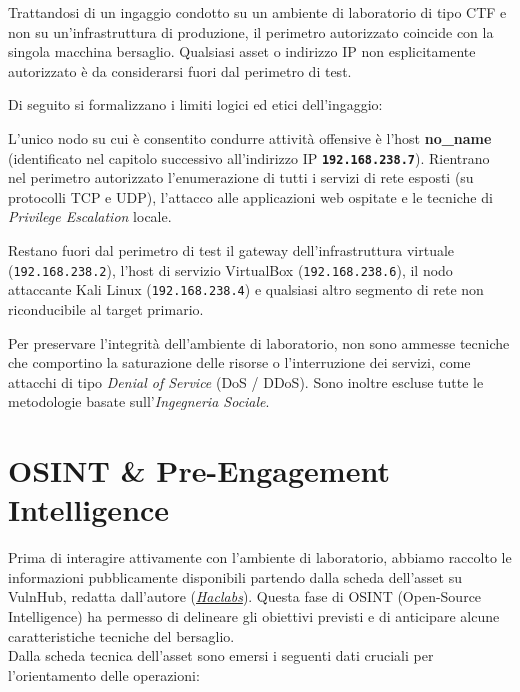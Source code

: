 \documentclass[11pt]{report}
\begin{document}
	Trattandosi di un ingaggio condotto su un ambiente di laboratorio di tipo CTF e non su un'infrastruttura di produzione, il perimetro autorizzato coincide con la singola macchina bersaglio. Qualsiasi asset o indirizzo IP non esplicitamente autorizzato è da considerarsi  fuori dal perimetro di test.
	
	Di seguito si formalizzano i limiti logici ed etici dell'ingaggio:
	
	\begin{description}[font=\color{headerblue}\bfseries, leftmargin=1cm, style=nextline]
		\item[In-Scope (Bersagli Autorizzati)] 
		L'unico nodo su cui è consentito condurre attività offensive è l'host \textbf{no\_name} (identificato nel capitolo successivo all'indirizzo IP \textbf{\texttt{192.168.238.7}}). Rientrano nel perimetro autorizzato l'enumerazione di tutti i servizi di rete esposti (su protocolli TCP e UDP), l'attacco alle applicazioni web ospitate e le tecniche di \textit{Privilege Escalation} locale.
		
		\item[Out-of-Scope (Bersagli Esclusi)] 
		Restano fuori dal perimetro di test il gateway dell'infrastruttura virtuale (\texttt{192.168.238.2}), l'host di servizio VirtualBox (\texttt{192.168.238.6}), il nodo attaccante Kali Linux (\texttt{192.168.238.4}) e qualsiasi altro segmento di rete non riconducibile al target primario.
		
		\item[Metodologie non consentite] 
		Per preservare l'integrità dell'ambiente di laboratorio, non sono ammesse tecniche che comportino la saturazione delle risorse o l'interruzione dei servizi, come attacchi di tipo \textit{Denial of Service} (DoS / DDoS). Sono inoltre escluse tutte le metodologie basate sull'\textit{Ingegneria Sociale}.
	\end{description}
	
	
	\section{OSINT \& Pre-Engagement Intelligence}
	Prima di interagire attivamente con l'ambiente di laboratorio, abbiamo raccolto le informazioni pubblicamente disponibili partendo dalla scheda dell'asset su VulnHub, redatta dall'autore (\textit{\href{https://www.vulnhub.com/entry/haclabs-no_name,429/}{Haclabs}}). Questa fase di OSINT (Open-Source Intelligence) ha permesso di delineare gli obiettivi previsti e di anticipare alcune caratteristiche tecniche del bersaglio.\\
	Dalla scheda tecnica dell'asset sono emersi i seguenti dati cruciali per l'orientamento delle operazioni:
	
\end{document}
